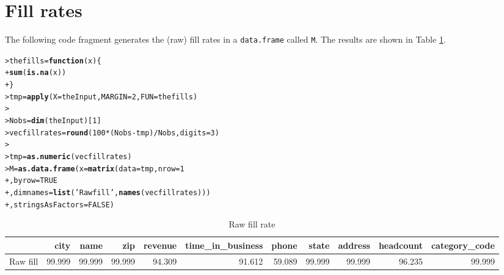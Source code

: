 \documentclass[12pt]{article}\usepackage[]{graphicx}\usepackage[]{color}
\makeatletter
\newcommand{\hlnum}[1]{\textcolor[rgb]{0.686,0.059,0.569}{#1}}%
\newcommand{\hlstr}[1]{\textcolor[rgb]{0.192,0.494,0.8}{#1}}%
\newcommand{\hlopt}[1]{\textcolor[rgb]{0,0,0}{#1}}%
\newcommand{\hlstd}[1]{\textcolor[rgb]{0.345,0.345,0.345}{#1}}%
\newcommand{\hlkwa}[1]{\textcolor[rgb]{0.161,0.373,0.58}{\textbf{#1}}}%
\newcommand{\hlkwb}[1]{\textcolor[rgb]{0.69,0.353,0.396}{#1}}%
\newcommand{\hlkwc}[1]{\textcolor[rgb]{0.333,0.667,0.333}{#1}}%
\newcommand{\hlkwd}[1]{\textcolor[rgb]{0.737,0.353,0.396}{\textbf{#1}}}%
\newenvironment{kframe}{%
 \def\at@end@of@kframe{}%
 \ifinner\ifhmode%
  \def\at@end@of@kframe{\end{minipage}}%
  \begin{minipage}{\columnwidth}%
 \fi\fi%
 \def\FrameCommand##1{\hskip\@totalleftmargin \hskip-\fboxsep
 \colorbox{shadecolor}{##1}\hskip-\fboxsep
     \hskip-\linewidth \hskip-\@totalleftmargin \hskip\columnwidth}%
 \MakeFramed {\advance\hsize-\width
   \@totalleftmargin\z@ \linewidth\hsize
   \@setminipage}}%
 {\par\unskip\endMakeFramed%
 \at@end@of@kframe}
\newenvironment{knitrout}{}{} %
\makeatother
\begin{document}
\section{Fill rates}
The following code fragment generates the (raw) fill rates in a \texttt{data.frame} called \texttt{M}.
The results are shown in Table \ref{tbl:rawfill}.
\begin{knitrout}\footnotesize
{}\color{fgcolor}\begin{kframe}
\begin{alltt}
\hlstd{> }\hlstd{thefills} \hlkwb{=} \hlkwa{function} \hlstd{(}\hlkwc{x}\hlstd{) \{}
\hlstd{+ }  \hlkwd{sum} \hlstd{(}\hlkwd{is.na} \hlstd{(x))}
\hlstd{+ }\hlstd{\}}
\hlstd{> }\hlstd{tmp} \hlkwb{=} \hlkwd{apply} \hlstd{(}\hlkwc{X}\hlstd{=theInput,} \hlkwc{MARGIN} \hlstd{=} \hlnum{2}\hlstd{,} \hlkwc{FUN}\hlstd{= thefills)}
\hlstd{> }
\hlstd{> }\hlstd{Nobs} \hlkwb{=} \hlkwd{dim} \hlstd{(theInput)[}\hlnum{1}\hlstd{]}
\hlstd{> }\hlstd{vecfillrates} \hlkwb{=} \hlkwd{round} \hlstd{(}\hlnum{100} \hlopt{*} \hlstd{(Nobs} \hlopt{-} \hlstd{tmp)}\hlopt{/}\hlstd{Nobs,} \hlkwc{digits} \hlstd{=} \hlnum{3}\hlstd{)}
\hlstd{> }
\hlstd{> }\hlstd{tmp} \hlkwb{=} \hlkwd{as.numeric} \hlstd{(vecfillrates)}
\hlstd{> }\hlstd{M} \hlkwb{=} \hlkwd{as.data.frame} \hlstd{(}\hlkwc{x}\hlstd{=}\hlkwd{matrix} \hlstd{(}\hlkwc{data}\hlstd{=tmp,} \hlkwc{nrow} \hlstd{=} \hlnum{1}
\hlstd{+ }                      \hlstd{,} \hlkwc{byrow} \hlstd{=} \hlnum{TRUE}
\hlstd{+ }                      \hlstd{,} \hlkwc{dimnames} \hlstd{=} \hlkwd{list} \hlstd{(}\hlstr{'Raw fill'}\hlstd{,} \hlkwd{names} \hlstd{(vecfillrates)))}
\hlstd{+ }            \hlstd{,} \hlkwc{stringsAsFactors} \hlstd{=} \hlnum{FALSE}\hlstd{)}
\end{alltt}
\end{kframe}
\end{knitrout}
\begin{table}[htb]
\begin{center}
{\tiny

\begin{tabular}{l|r|r|r|r|r|r|r|r|r|r}
\hline
  & city & name & zip & revenue & time\_in\_business & phone & state & address & headcount & category\_code\\
\hline
Raw fill & 99.999 & 99.999 & 99.999 & 94.309 & 91.612 & 59.089 & 99.999 & 99.999 & 96.235 & 99.999\\
\hline
\end{tabular}

}
\label{tbl:rawfill}
\caption{\small Raw fill rate}
\end{center}
\end{table}
\end{document}
